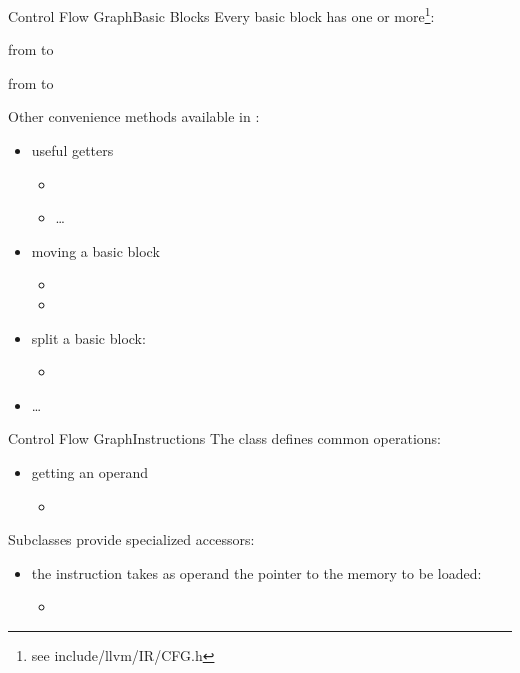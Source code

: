 \begin{frame}{Control Flow Graph}{Basic Blocks}
Every basic block  has one or more\footnote{see include/llvm/IR/CFG.h}:

\begin{description}[predecessors]
\item[predecessors] from  to
\item[successors] from  to
\end{description}

\vfill
Other convenience methods available in :

\begin{itemize}
\item useful getters
\begin{itemize}
\item {}
\item \ldots
\end{itemize}
\item moving a basic block
\begin{itemize}
\item      {}
\item      {}
\end{itemize}
\item split a basic block:
\begin{itemize}
\item      {}
\end{itemize}
\item \ldots
\end{itemize}
\end{frame}


\begin{frame}{Control Flow Graph}{Instructions}
The  class defines common operations: \\
\medskip
\begin{itemize}
\item getting an operand
\begin{itemize}
\item {}
\end{itemize}
\end{itemize}
\vfill
Subclasses provide specialized accessors: \\
\medskip
\begin{itemize}
\item the  instruction takes as operand the pointer to the memory to be loaded:
\begin{itemize}
\item      {}
\end{itemize}
\end{itemize}
\end{frame}


